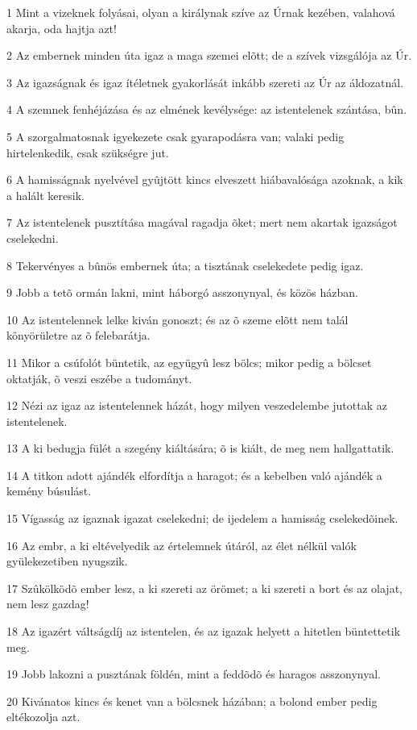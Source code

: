 \par 1 Mint a vizeknek folyásai, olyan a királynak szíve az Úrnak kezében, valahová akarja, oda hajtja azt!
\par 2 Az embernek minden úta igaz a maga szemei elõtt; de a szívek vizsgálója az Úr.
\par 3 Az igazságnak és igaz ítéletnek gyakorlását inkább szereti az Úr az áldozatnál.
\par 4 A szemnek fenhéjázása és az elmének kevélysége: az istentelenek szántása, bûn.
\par 5 A szorgalmatosnak igyekezete csak gyarapodásra van; valaki pedig hirtelenkedik, csak szükségre jut.
\par 6 A hamisságnak nyelvével gyûjtött kincs elveszett hiábavalósága azoknak, a kik a halált keresik.
\par 7 Az istentelenek pusztítása magával ragadja õket; mert nem akartak igazságot cselekedni.
\par 8 Tekervényes a bûnös embernek úta; a tisztának cselekedete pedig igaz.
\par 9 Jobb a tetõ ormán lakni, mint háborgó asszonynyal, és közös házban.
\par 10 Az istentelennek lelke kiván gonoszt; és az õ szeme elõtt nem talál könyörületre az õ felebarátja.
\par 11 Mikor a csúfolót büntetik, az együgyû lesz bölcs; mikor pedig a bölcset oktatják, õ veszi eszébe a tudományt.
\par 12 Nézi az igaz az istentelennek házát, hogy milyen veszedelembe jutottak az istentelenek.
\par 13 A ki bedugja fülét a szegény kiáltására; õ is kiált, de meg nem hallgattatik.
\par 14 A titkon adott ajándék elfordítja a haragot; és a kebelben való ajándék a kemény búsulást.
\par 15 Vígasság az igaznak igazat cselekedni; de ijedelem a hamisság cselekedõinek.
\par 16 Az embr, a ki eltévelyedik az értelemnek útáról, az élet nélkül valók gyülekezetiben nyugszik.
\par 17 Szûkölködõ ember lesz, a ki szereti az örömet; a ki szereti a bort és az olajat, nem lesz gazdag!
\par 18 Az igazért váltságdíj az istentelen, és az igazak helyett a hitetlen büntettetik meg.
\par 19 Jobb lakozni a pusztának földén, mint a feddõdõ és haragos asszonynyal.
\par 20 Kivánatos kincs és kenet van a bölcsnek házában; a bolond ember pedig eltékozolja azt.
